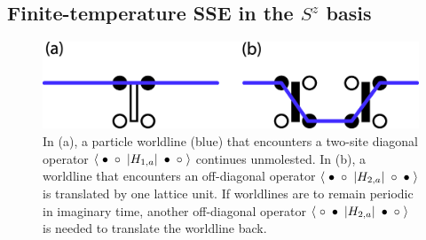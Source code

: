 \documentclass[vecphys]{svmult}
\begin{document}
\subsection{Finite-temperature SSE in the $S^z$ basis} \label{Melko:HeisfiniteT}

\begin{figure}[t]
\centering
\includegraphics*[width=.7\textwidth]{diag_offdiag.eps}
\caption[]{In (a), a particle worldline (blue) that encounters a two-site diagonal operator $\langle \hspace{1mm} \bullet \hspace{1mm}  \circ \hspace{1mm}  | H_{1,a} | \hspace{1mm} \bullet \hspace{1mm} \circ \hspace{1mm} \rangle$ continues unmolested.  In (b), a worldline that encounters an off-diagonal operator $\langle \hspace{1mm} \bullet \hspace{1mm}  \circ \hspace{1mm}  | H_{2,a} | \hspace{1mm} \circ \hspace{1mm} \bullet \hspace{1mm} \rangle $ is translated by one lattice unit.  If worldlines are to remain periodic in imaginary time, another off-diagonal operator $\langle \hspace{1mm} \circ \hspace{1mm}  \bullet \hspace{1mm}  | H_{2,a} | \hspace{1mm} \bullet \hspace{1mm} \circ \hspace{1mm} \rangle$ is needed to translate the worldline back.}
\label{Melko:fig:1}      
\end{figure} 
\end{document}
